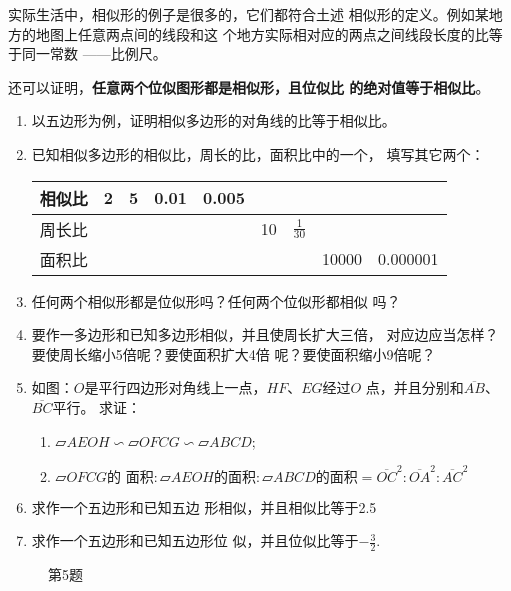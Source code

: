 实际生活中，相似形的例子是很多的，它们都符合土述
相似形的定义。例如某地方的地图上任意两点间的线段和这
个地方实际相对应的两点之间线段长度的比等于同一常数
——比例尺。

还可以证明，\textbf{任意两个位似图形都是相似形，且位似比
的绝对值等于相似比}。


\begin{ex}
\begin{enumerate}
    \item 以五边形为例，证明相似多边形的对角线的比等于相似比。
    \item 已知相似多边形的相似比，周长的比，面积比中的一个，
    填写其它两个：
\begin{center}
\begin{tabular}{c|cccccccc}
    \hline
    相似比 &    2&    5&    0.01&    0.005\\
    \hline
    周长比&&&&&    10&   $\tfrac{1}{30}$\\
    \hline
    面积比&&&&&&&    10000&    0.000001\\
    \hline
\end{tabular}
\end{center}

\item 任何两个相似形都是位似形吗？任何两个位似形都相似
吗？
\item 要作一多边形和已知多边形相似，并且使周长扩大三倍，
对应边应当怎样？要使周长缩小5倍呢？要使面积扩大4倍
呢？要使面积缩小9倍呢？
\item 如图：$O$是平行四边形对角线上一点，$HF$、$EG$经过$O$
点，并且分别和$\overline{AB}$、$\overline{BC}$平行。
求证：
\begin{enumerate}
    \item $\parallelogram{AEOH}\backsim \parallelogram OFCG \backsim \parallelogram ABCD$;
    \item $\parallelogram OFCG\text{的
面积}:\parallelogram AEOH\text{的面积}:\parallelogram ABCD\text{的面积}=\overline{OC}^2:\overline{OA}^2:\overline{AC}^2$
\end{enumerate}

\item 求作一个五边形和已知五边
形相似，并且相似比等于2.5
\item 求作一个五边形和已知五边形位
似，并且位似比等于$-\frac{3}{2}$.
\end{enumerate}
\end{ex}

\begin{figure}[htp]
    \centering
{}
    \caption*{第5题}
\end{figure}


